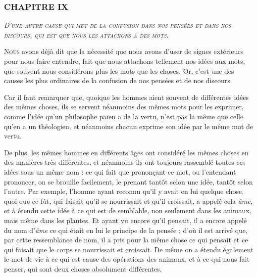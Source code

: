 \subsubsection{\centering \Large CHAPITRE IX}
\begin{center}\emph{\large\scshape D'une autre cause qui met de la confusion dans nos pensées et dans nos discours, qui est que nous les attachons à des mots.}\end{center}

	\lettrine{N}{ous} avons déjà dit que la nécessité que nous avons d'user de signes extérieurs pour nous faire entendre, fait que nous attachons tellement nos idées aux mots, que souvent nous considérons plus les mots que les choses. Or, c'est une des causes les plus ordinaires de la confusion de nos pensées et de nos discours.

Car il faut remarquer que, quoique les hommes aient souvent de différentes idées des mêmes choses, ils se servent néanmoins des mêmes mots pour les exprimer, comme l'idée qu'un philosophe païen a de la vertu, n'est pas la même que celle qu'en a un théologien, et néanmoins chacun exprime son idée par le même mot de vertu.

De plus, les mêmes hommes en différents âges ont considéré les mêmes choses en des manières très différentes, et néanmoins ils ont toujours rassemblé toutes ces idées sous un même nom : ce qui fait que prononçant ce mot, ou l'entendant prononcer, on se brouille facilement, le prenant tantôt selon une idée, tantôt selon l'autre. Par exemple, l'homme ayant reconnu qu'il y avait en lui quelque chose, quoi que ce fût, qui faisait qu'il se nourrissait et qu'il croissait, a appelé cela \emph{âme}, et à étendu cette idée à ce qui est de semblable, non seulement dans les animaux, mais même dans les plantes. Et ayant vu encore qu'il pensait, il a encore appelé du nom d'\emph{âme} ce qui était en lui le principe de la pensée ; d'où il est arrivé que, par cette ressemblance de nom, il a pris pour la même chose ce qui pensait et ce qui faisait que le corps se nourrissait et croissait. De même on a étendu également le mot de vie à ce qui est cause des opérations des animaux, et à ce qui nous fait penser, qui sont deux choses absolument différentes.

